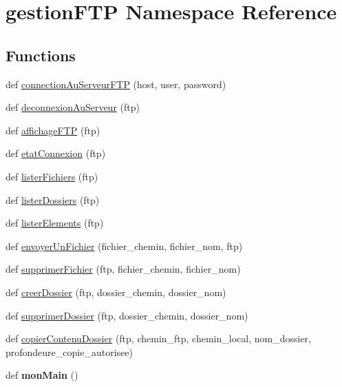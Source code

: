 \hypertarget{namespacegestion_f_t_p}{}\section{gestion\+F\+TP Namespace Reference}
\label{namespacegestion_f_t_p}
\subsection*{Functions}
\begin{DoxyCompactItemize}
\item 
def \hyperlink{namespacegestion_f_t_p_ac302a85ee832b8ee7df6332236fb03fd}{connection\+Au\+Serveur\+F\+TP} (host, user, password)
\item 
def \hyperlink{namespacegestion_f_t_p_a9af85f209eb48e2ab12361a74c23357d}{deconnexion\+Au\+Serveur} (ftp)
\item 
def \hyperlink{namespacegestion_f_t_p_af55225f5cdcb61a67ac02eeebf5f3860}{affichage\+F\+TP} (ftp)
\item 
def \hyperlink{namespacegestion_f_t_p_a18440a52ad61b01732d15fcbd809f0d6}{etat\+Connexion} (ftp)
\item 
def \hyperlink{namespacegestion_f_t_p_a8ea306f854213c2d395b2ee10d648309}{lister\+Fichiers} (ftp)
\item 
def \hyperlink{namespacegestion_f_t_p_a2f67d833c10d35ec09aab3185d4b92f3}{lister\+Dossiers} (ftp)
\item 
def \hyperlink{namespacegestion_f_t_p_a137686a569213bca2d098b55ca5bb22e}{lister\+Elements} (ftp)
\item 
def \hyperlink{namespacegestion_f_t_p_ae9eaad537c75d8beb4d50100f6b7eb53}{envoyer\+Un\+Fichier} (fichier\+\_\+chemin, fichier\+\_\+nom, ftp)
\item 
def \hyperlink{namespacegestion_f_t_p_a9ed81ad37ebdebc0cdf8fe7d902ea3d6}{supprimer\+Fichier} (ftp, fichier\+\_\+chemin, fichier\+\_\+nom)
\item 
def \hyperlink{namespacegestion_f_t_p_a64e31d4eac232d50fde68a2bd4b75f5d}{creer\+Dossier} (ftp, dossier\+\_\+chemin, dossier\+\_\+nom)
\item 
def \hyperlink{namespacegestion_f_t_p_a2dc69e6943fef6bd469d230867d3b4a6}{supprimer\+Dossier} (ftp, dossier\+\_\+chemin, dossier\+\_\+nom)
\item 
def \hyperlink{namespacegestion_f_t_p_a321839c920f9e83567746d4036f93ea0}{copier\+Contenu\+Dossier} (ftp, chemin\+\_\+ftp, chemin\+\_\+local, nom\+\_\+dossier, profondeure\+\_\+copie\+\_\+autorisee)
\item 
def {\bfseries mon\+Main} ()\hypertarget{namespacegestion_f_t_p_a60eb7697458514d4a24011cab1c4d559}{}\label{namespacegestion_f_t_p_a60eb7697458514d4a24011cab1c4d559}

\end{DoxyCompactItemize}


